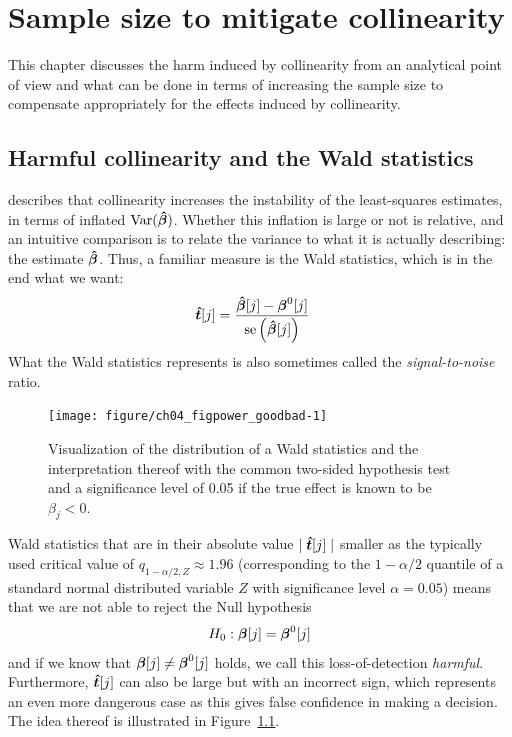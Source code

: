 \documentclass[11pt,a4paper,twoside]{book}\usepackage[]{graphicx}\usepackage[]{xcolor}
\newenvironment{knitrout}{}{} %
\begin{document}
\chapter{Sample size to mitigate collinearity}\label{chap:two_way_anova}

This chapter discusses the harm induced by collinearity from an analytical point of view and what can be done in terms of increasing the sample size to compensate appropriately for the effects induced by collinearity.
\section{Harmful collinearity and the Wald statistics}
\cite{Belsley1991} describes that collinearity increases the instability of the least-squares estimates, in terms of inflated $\operatorname{Var}({\boldsymbol{\hat\beta}})$. Whether this inflation is large or not is relative, and an intuitive comparison is to relate the variance to what it is actually describing: the estimate ${\boldsymbol{\hat\beta}}$. Thus, a familiar measure is the Wald statistics, which is in the end what we want:
\begin{align}
{\boldsymbol{\hat{t}}}[j]&=\frac{{\boldsymbol{\hat\beta}}[j] - {\boldsymbol{\beta}}^0[j]}{\text{se}\left({\boldsymbol{\hat\beta}}[j]\right)} \label{eq:wald}
\end{align}
What the Wald statistics represents is also sometimes called the \textit{signal-to-noise} ratio.

\begin{figure}[H]%
\begin{center}
\begin{knitrout}
\color{fgcolor}
\texttt{[image: figure/ch04\_figpower\_goodbad-1]} 
\end{knitrout}
\end{center}
\vspace{-0.5cm}
\caption{Visualization of the distribution of a Wald statistics and the interpretation thereof with the common two-sided hypothesis test and a significance level of 0.05 if the true effect is known to be $\beta_j<0$.}
\label{fig:power_goodbad}
\end{figure}
Wald statistics that are in their absolute value $\mid{\boldsymbol{\hat{t}}}[j]\mid$ smaller as the typically used critical value of $q_{1-\alpha/2,Z}\approx 1.96$ (corresponding to the $1-\alpha/2$ quantile of a standard normal distributed variable $Z$ with significance level $\alpha=0.05$) means that we are not able to reject the Null hypothesis
\begin{align*}
H_0:{\boldsymbol{\beta}}[j]={\boldsymbol{\beta}}^0[j]
\end{align*}
and if we know that ${\boldsymbol{\beta}}[j]\neq{\boldsymbol{\beta}}^0[j]$ holds, we call this loss-of-detection \textit{harmful}. Furthermore, ${\boldsymbol{\hat{t}}}[j]$ can also be large but with an incorrect sign, which represents an even more dangerous case as this gives false confidence in making a decision. The idea thereof is illustrated in Figure~\ref{fig:power_goodbad}. 
\end{document}
